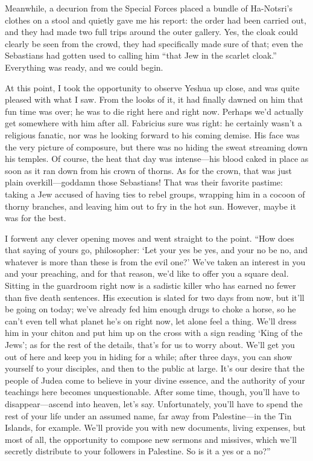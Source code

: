 Meanwhile, a decurion from the Special Forces placed a bundle of Ha-Notsri's clothes on a stool and quietly gave me his report: the order had been carried out, and they had made two full trips around the outer gallery. Yes, the cloak could clearly be seen from the crowd, they had specifically made sure of that; even the Sebastians had gotten used to calling him ``that Jew in the scarlet cloak.'' Everything was ready, and we could begin.

At this point, I took the opportunity to observe Yeshua up close, and was quite pleased with what I saw. From the looks of it, it had finally dawned on him that fun time was over; he was to die right here and right now. Perhaps we'd actually get somewhere with him after all. Fabricius sure was right: he certainly wasn't a religious fanatic, nor was he looking forward to his coming demise. His face was the very picture of composure, but there was no hiding the sweat streaming down his temples. Of course, the heat that day was intense---his blood caked in place as soon as it ran down from his crown of thorns. As for the crown, that was just plain overkill---goddamn those Sebastians! That was their favorite pastime: taking a Jew accused of having ties to rebel groups, wrapping him in a cocoon of thorny branches, and leaving him out to fry in the hot sun. However, maybe it was for the best.

I forwent any clever opening moves and went straight to the point. ``How does that saying of yours go, philosopher: `Let your yes be yes, and your no be no, and whatever is more than these is from the evil one?' We've taken an interest in you and your preaching, and for that reason, we'd like to offer you a square deal. Sitting in the guardroom right now is a sadistic killer who has earned no fewer than five death sentences. His execution is slated for two days from now, but it'll be going on today; we've already fed him enough drugs to choke a horse, so he can't even tell what planet he's on right now, let alone feel a thing. We'll dress him in your chiton and put him up on the cross with a sign reading `King of the Jews'; as for the rest of the details, that's for us to worry about. We'll get you out of here and keep you in hiding for a while; after three days, you can show yourself to your disciples, and then to the public at large. It's our desire that the people of Judea come to believe in your divine essence, and the authority of your teachings here becomes unquestionable. After some time, though, you'll have to disappear---ascend into heaven, let's say. Unfortunately, you'll have to spend the rest of your life under an assumed name, far away from Palestine---in the Tin Islands, for example. We'll provide you with new documents, living expenses, but most of all, the opportunity to compose new sermons and missives, which we'll secretly distribute to your followers in Palestine. So is it a yes or a no?''

